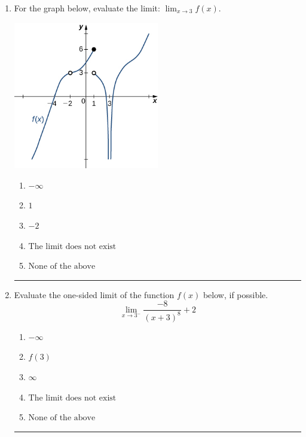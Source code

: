 \documentclass[14pt]{extbook}
\newcommand{\litem}[1]{\item#1\hspace*{-1cm}\rule{\textwidth}{0.4pt}}
\begin{document}
\begin{enumerate}
\litem{
For the graph below, evaluate the limit: $ \displaystyle \lim_{x \rightarrow 3} f(x)$.
\begin{center}
    \includegraphics[width=0.5\textwidth]{../Figures/evaluateLimitGraphicallyC.png}
\end{center}
\begin{enumerate}[label=\Alph*.]
\item \( -\infty \)
\item \( 1 \)
\item \( -2 \)
\item \( \text{The limit does not exist} \)
\item \( \text{None of the above} \)

\end{enumerate} }
\litem{
Evaluate the one-sided limit of the function $f(x)$ below, if possible.\[ \lim_{x \rightarrow 3^-} \frac{-8}{(x+3)^8}+2 \]\begin{enumerate}[label=\Alph*.]
\item \( -\infty \)
\item \( f(3) \)
\item \( \infty \)
\item \( \text{The limit does not exist} \)
\item \( \text{None of the above} \)


\end{enumerate}}
\end{enumerate}
\end{document}
